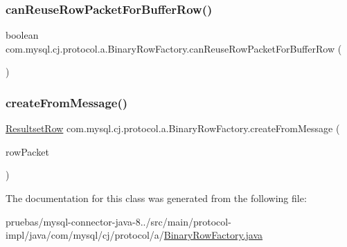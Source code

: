 \subsubsection{\texorpdfstring{can\+Reuse\+Row\+Packet\+For\+Buffer\+Row()}{canReuseRowPacketForBufferRow()}}
{\footnotesize\ttfamily boolean com.\+mysql.\+cj.\+protocol.\+a.\+Binary\+Row\+Factory.\+can\+Reuse\+Row\+Packet\+For\+Buffer\+Row (\begin{DoxyParamCaption}{ }\end{DoxyParamCaption})}

\mbox{\label{classcom_1_1mysql_1_1cj_1_1protocol_1_1a_1_1_binary_row_factory_a02bc6bd4142c4797180e402e70065e7e}} 
\subsubsection{\texorpdfstring{create\+From\+Message()}{createFromMessage()}}
{\footnotesize\ttfamily \mbox{\hyperlink{interfacecom_1_1mysql_1_1cj_1_1protocol_1_1_resultset_row}{Resultset\+Row}} com.\+mysql.\+cj.\+protocol.\+a.\+Binary\+Row\+Factory.\+create\+From\+Message (\begin{DoxyParamCaption}\item[{\mbox{\hyperlink{classcom_1_1mysql_1_1cj_1_1protocol_1_1a_1_1_native_packet_payload}{Native\+Packet\+Payload}}}]{row\+Packet }\end{DoxyParamCaption})}



The documentation for this class was generated from the following file\+:\begin{DoxyCompactItemize}
\item 
pruebas/mysql-\/connector-\/java-\/8../src/main/protocol-\/impl/java/com/mysql/cj/protocol/a/\mbox{\hyperlink{_binary_row_factory_8java}{Binary\+Row\+Factory.\+java}}\end{DoxyCompactItemize}
